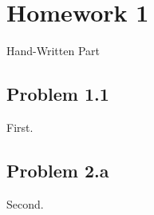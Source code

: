 \documentclass[12pt]{memoir}
\begin{document}
\setcounter{chapter}{1}
\chapter*{Homework 1}
\begin{center}\Large Hand-Written Part\end{center}
\section*{Problem 1.1}
First.
\section*{Problem 2.a}
Second.
\end{document}
